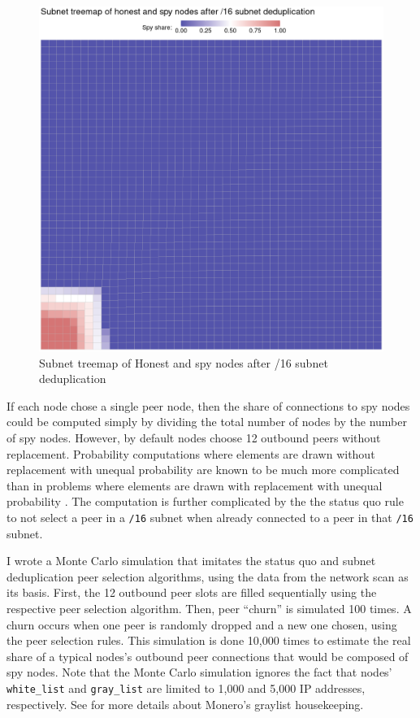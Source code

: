 \documentclass[usletter,11pt,english,openany]{article}
\begin{document}
\begin{figure}[H]
\caption{Subnet treemap of Honest and spy nodes after /16 subnet deduplication}

\label{fig-post-dedup-treemap}

\includegraphics[scale=0.5]{images/treemap-16-subnet-deduplication}
\end{figure}

If each node chose a single peer node, then the share of connections
to spy nodes could be computed simply by dividing the total number
of nodes by the number of spy nodes. However, by default nodes choose
12 outbound peers without replacement. Probability computations where
elements are drawn without replacement with unequal probability are
known to be much more complicated than in problems where elements
are drawn with replacement with unequal probability \cite{TILLE2023100533}.
The computation is further complicated by the the status quo rule
to not select a peer in a \texttt{/16} subnet when already connected
to a peer in that \texttt{/16} subnet.

I wrote a Monte Carlo simulation that imitates the status quo and
subnet deduplication peer selection algorithms, using the data from
the network scan as its basis. First, the 12 outbound peer slots are
filled sequentially using the respective peer selection algorithm.
Then, peer ``churn'' is simulated 100 times. A churn occurs when
one peer is randomly dropped and a new one chosen, using the peer
selection rules. This simulation is done 10,000 times to estimate
the real share of a typical nodes's outbound peer connections that
would be composed of spy nodes. Note that the Monte Carlo simulation
ignores the fact that nodes' \texttt{white\_list} and \texttt{gray\_list}
are limited to 1,000 and 5,000 IP addresses, respectively. See \cite{Cao2020}
for more details about Monero's graylist housekeeping.
\end{document}
